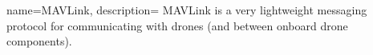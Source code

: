 

{
    name={MAVLink},
    description={
        MAVLink is a very lightweight messaging protocol for communicating with drones (and between onboard drone components).
    }
}
